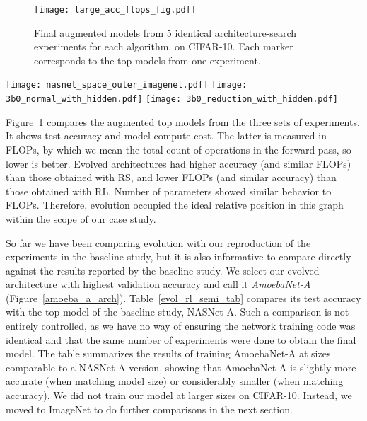 \documentclass[letterpaper]{article} \usepackage{aaai19}  \usepackage{times}  \usepackage{helvet}  \usepackage{courier}  \usepackage{graphicx}  \frenchspacing
\begin{document}
\begin{figure}[ht]
\centering
\texttt{[image: large\_acc\_flops\_fig.pdf]}
\caption{Final augmented models from 5 identical architecture-search experiments for each algorithm, on CIFAR-10. Each marker corresponds to the top models from one experiment.}
\label{evol_rl_rs_aug_fig}
\end{figure}

\begin{figure*}[b!]
\centering
\texttt{[image: nasnet\_space\_outer\_imagenet.pdf]}
\hspace{0.07\linewidth}
\texttt{[image: 3b0\_normal\_with\_hidden.pdf]}
\hspace{0.05\linewidth}
\texttt{[image: 3b0\_reduction\_with\_hidden.pdf]}
\caption{\mbox{AmoebaNet-A} architecture. The overall model \cite{zoph2017learning} (LEFT) and the \mbox{AmoebaNet-A} normal cell (MIDDLE) and reduction cell (RIGHT).}
\label{amoeba_a_arch}
\end{figure*}

Figure~\ref{evol_rl_rs_aug_fig} compares the augmented top models from the three sets of experiments. It shows test accuracy and model compute cost. The latter is measured in FLOPs, by which we mean the total count of operations in the forward pass, so lower is better. Evolved architectures had higher accuracy (and similar FLOPs) than those obtained with RS, and lower FLOPs (and similar accuracy) than those obtained with RL. Number of parameters showed similar behavior to FLOPs. Therefore, evolution occupied the ideal relative position in this graph within the scope of our case study.

So far we have been comparing evolution with our reproduction of the experiments in the baseline study, but it is also informative to compare directly against the results reported by the baseline study. We select our evolved architecture with highest validation accuracy and call it \mbox{\textit{AmoebaNet-A}} (Figure~\ref{amoeba_a_arch}). Table~\ref{evol_rl_semi_tab} compares its test accuracy with the top model of the baseline study, NASNet-A. Such a comparison is not entirely controlled, as we have no way of ensuring the network training code was identical and that the same number of experiments were done to obtain the final model. The table summarizes the results of training \mbox{AmoebaNet-A} at sizes comparable to a NASNet-A version, showing that \mbox{AmoebaNet-A} is slightly more accurate (when matching model size) or considerably smaller (when matching accuracy). We did not train our model at larger sizes on CIFAR-10. Instead, we moved to ImageNet to do further comparisons in the next section.
\end{document}
